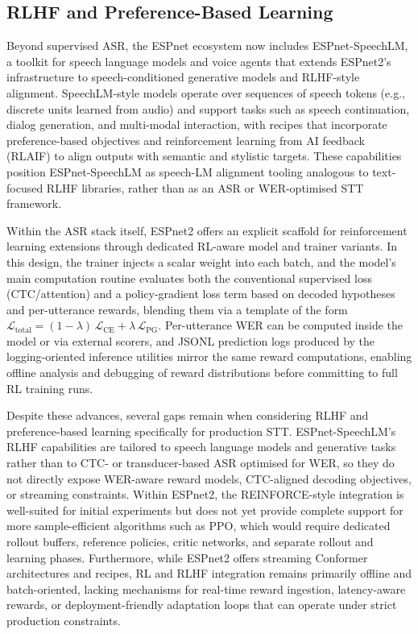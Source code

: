\documentclass[conference]{IEEEtran}
\begin{document}
\subsection{RLHF and Preference-Based Learning}

Beyond supervised ASR, the ESPnet ecosystem now includes ESPnet-SpeechLM, a toolkit for speech language models and voice agents that extends ESPnet2’s infrastructure to speech-conditioned generative models and RLHF-style alignment.
SpeechLM-style models operate over sequences of speech tokens (e.g., discrete units learned from audio) and support tasks such as speech continuation, dialog generation, and multi-modal interaction, with recipes that incorporate preference-based objectives and reinforcement learning from AI feedback (RLAIF) to align outputs with semantic and stylistic targets.
These capabilities position ESPnet-SpeechLM as speech-LM alignment tooling analogous to text-focused RLHF libraries, rather than as an ASR or WER-optimised STT framework.

Within the ASR stack itself, ESPnet2 offers an explicit scaffold for reinforcement learning extensions through dedicated RL-aware model and trainer variants.
In this design, the trainer injects a scalar weight into each batch, and the model’s main computation routine evaluates both the conventional supervised loss (CTC/attention) and a policy-gradient loss term based on decoded hypotheses and per-utterance rewards, blending them via a template of the form \(\mathcal{L}_{\text{total}} = (1 - \lambda)\,\mathcal{L}_{\text{CE}} + \lambda\,\mathcal{L}_{\text{PG}}\).
Per-utterance WER can be computed inside the model or via external scorers, and JSONL prediction logs produced by the logging-oriented inference utilities mirror the same reward computations, enabling offline analysis and debugging of reward distributions before committing to full RL training runs.

Despite these advances, several gaps remain when considering RLHF and preference-based learning specifically for production STT.
ESPnet-SpeechLM’s RLHF capabilities are tailored to speech language models and generative tasks rather than to CTC- or transducer-based ASR optimised for WER, so they do not directly expose WER-aware reward models, CTC-aligned decoding objectives, or streaming constraints.
Within ESPnet2, the REINFORCE-style integration is well-suited for initial experiments but does not yet provide complete support for more sample-efficient algorithms such as PPO, which would require dedicated rollout buffers, reference policies, critic networks, and separate rollout and learning phases.
Furthermore, while ESPnet2 offers streaming Conformer architectures and recipes, RL and RLHF integration remains primarily offline and batch-oriented, lacking mechanisms for real-time reward ingestion, latency-aware rewards, or deployment-friendly adaptation loops that can operate under strict production constraints.
\end{document}
